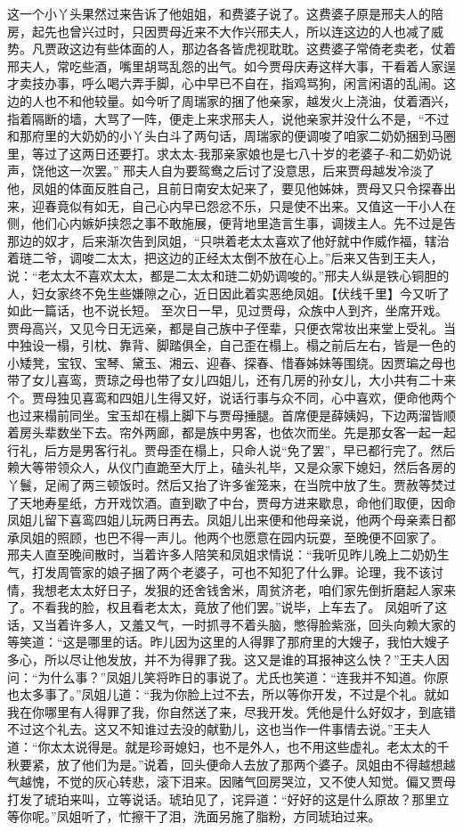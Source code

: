 \documentclass[12pt,oneside]{book}
\begin{document}
这一个小丫头果然过来告诉了他姐姐，和费婆子说了。这费婆子原是邢夫人的陪房，起先也曾兴过时，只因贾母近来不大作兴邢夫人，所以连这边的人也减了威势。凡贾政这边有些体面的人，那边各各皆虎视耽耽。这费婆子常倚老卖老，仗着邢夫人，常吃些酒，嘴里胡骂乱怨的出气。如今贾母庆寿这样大事，干看着人家逞才卖技办事，呼么喝六弄手脚，心中早已不自在，指鸡骂狗，闲言闲语的乱闹。这边的人也不和他较量。如今听了周瑞家的捆了他亲家，越发火上浇油，仗着酒兴，指着隔断的墙，大骂了一阵，便走上来求邢夫人，说他亲家并没什么不是，“不过和那府里的大奶奶的小丫头白斗了两句话，周瑞家的便调唆了咱家二奶奶捆到马圈里，等过了这两日还要打。求太太-我那亲家娘也是七八十岁的老婆子-和二奶奶说声，饶他这一次罢。”
邢夫人自为要鸳鸯之后讨了没意思，后来贾母越发冷淡了他，凤姐的体面反胜自己，且前日南安太妃来了，要见他姊妹，贾母又只令探春出来，迎春竟似有如无，自己心内早已怨忿不乐，只是使不出来。又值这一干小人在侧，他们心内嫉妒挟怨之事不敢施展，便背地里造言生事，调拨主人。先不过是告那边的奴才，后来渐次告到凤姐，“只哄着老太太喜欢了他好就中作威作福，辖治着琏二爷，调唆二太太，把这边的正经太太倒不放在心上。”后来又告到王夫人，说：“老太太不喜欢太太，都是二太太和琏二奶奶调唆的。”邢夫人纵是铁心铜胆的人，妇女家终不免生些嫌隙之心，近日因此着实恶绝凤姐。【伏线千里】今又听了如此一篇话，也不说长短。
至次日一早，见过贾母，众族中人到齐，坐席开戏。贾母高兴，又见今日无远亲，都是自己族中子侄辈，只便衣常妆出来堂上受礼。当中独设一榻，引枕、靠背、脚踏俱全，自己歪在榻上。榻之前后左右，皆是一色的小矮凳，宝钗、宝琴、黛玉、湘云、迎春、探春、惜春姊妹等围绕。因贾㻞之母也带了女儿喜鸾，贾琼之母也带了女儿四姐儿，还有几房的孙女儿，大小共有二十来个。贾母独见喜鸾和四姐儿生得又好，说话行事与众不同，心中喜欢，便命他两个也过来榻前同坐。宝玉却在榻上脚下与贾母捶腿。首席便是薛姨妈，下边两溜皆顺着房头辈数坐下去。帘外两廊，都是族中男客，也依次而坐。先是那女客一起一起行礼，后方是男客行礼。贾母歪在榻上，只命人说“免了罢”，早已都行完了。然后赖大等带领众人，从仪门直跪至大厅上，磕头礼毕，又是众家下媳妇，然后各房的丫鬟，足闹了两三顿饭时。然后又抬了许多雀笼来，在当院中放了生。贾赦等焚过了天地寿星纸，方开戏饮酒。直到歇了中台，贾母方进来歇息，命他们取便，因命凤姐儿留下喜鸾四姐儿玩两日再去。凤姐儿出来便和他母亲说，他两个母亲素日都承凤姐的照顾，也巴不得一声儿。他两个也愿意在园内玩耍，至晚便不回家了。
邢夫人直至晚间散时，当着许多人陪笑和凤姐求情说：“我听见昨儿晚上二奶奶生气，打发周管家的娘子捆了两个老婆子，可也不知犯了什么罪。论理，我不该讨情，我想老太太好日子，发狠的还舍钱舍米，周贫济老，咱们家先倒折磨起人家来了。不看我的脸，权且看老太太，竟放了他们罢。”说毕，上车去了。
凤姐听了这话，又当着许多人，又羞又气，一时抓寻不着头脑，憋得脸紫涨，回头向赖大家的等笑道：“这是哪里的话。昨儿因为这里的人得罪了那府里的大嫂子，我怕大嫂子多心，所以尽让他发放，并不为得罪了我。这又是谁的耳报神这么快？”王夫人因问：“为什么事？”凤姐儿笑将昨日的事说了。尤氏也笑道：“连我并不知道。你原也太多事了。”凤姐儿道：“我为你脸上过不去，所以等你开发，不过是个礼。就如我在你哪里有人得罪了我，你自然送了来，尽我开发。凭他是什么好奴才，到底错不过这个礼去。这又不知谁过去没的献勤儿，这也当作一件事情去说。”王夫人道：“你太太说得是。就是珍哥媳妇，也不是外人，也不用这些虚礼。老太太的千秋要紧，放了他们为是。”说着，回头便命人去放了那两个婆子。凤姐由不得越想越气越愧，不觉的灰心转悲，滚下泪来。因赌气回房哭泣，又不使人知觉。偏又贾母打发了琥珀来叫，立等说话。琥珀见了，诧异道：“好好的这是什么原故？那里立等你呢。”凤姐听了，忙擦干了泪，洗面另施了脂粉，方同琥珀过来。
\end{document}
